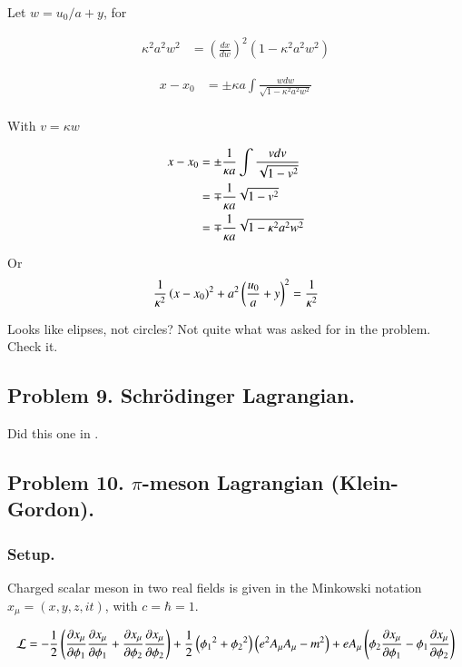 \documentclass{article}
\begin{document}
Let $w = u_0/a + y$, for

\begin{align*}
\kappa^2 a^2 w^2 &= \left(\frac{dx}{dw}\right)^2 (1 - \kappa^2 a^2 w^2 )
\end{align*}

\begin{align*}
x - x_0 &=
\pm \kappa a \int \frac{w dw }{\sqrt{ 1 - \kappa^2 a^2 w^2 }} \\
\end{align*}

With $v = \kappa w$

\begin{align*}
x - x_0 
&=
\pm \frac{1}{\kappa a} \int \frac{v dv }{\sqrt{ 1 - v^2 }} \\
&=
\mp \frac{1}{\kappa a} \sqrt{ 1 - v^2 } \\
&=
\mp \frac{1}{\kappa a} \sqrt{ 1 - \kappa^2 a^2 w^2 } \\
\end{align*}

Or
\begin{align*}
\frac{1}{\kappa^2}\left({x}- {x_0} \right)^2 + a^2 \left(\frac{u_0}{a} + y\right)^2 = \frac{1}{\kappa^2}
\end{align*}

Looks like elipses, not circles?  Not quite what was asked for in the problem.  Check it.

\subsection{ Problem 9.  Schr\"{o}dinger Lagrangian. }

Did this one in \cite{PJgoldch1}.

\subsection{ Problem 10.  $\pi$-meson Lagrangian (Klein-Gordon). }

\subsubsection{ Setup. }

Charged scalar meson in two real fields is given in the Minkowski notation $x_\mu = (x,y,z,it)$, with $c = \hbar = 1$.

\begin{align}
\mathcal{L} = -\frac{1}{2}\left( 
\frac{\partial{x_\mu}}{\partial {\phi_1}} \frac{\partial{x_\mu}}{\partial {\phi_1}} 
+ \frac{\partial{x_\mu}}{\partial {\phi_2}} \frac{\partial{x_\mu}}{\partial {\phi_2}} 
\right)
+ \frac{1}{2}
\left( 
{\phi_1}^2 
+ {\phi_2}^2 
\right)
\left( e^2 A_\mu A_\mu - m^2 \right) 
+ e A_\mu \left(
\phi_2 \frac{\partial{x_\mu}}{\partial {\phi_1}}
-\phi_1 \frac{\partial{x_\mu}}{\partial {\phi_2}}
\right)
\end{align}
\end{document}
